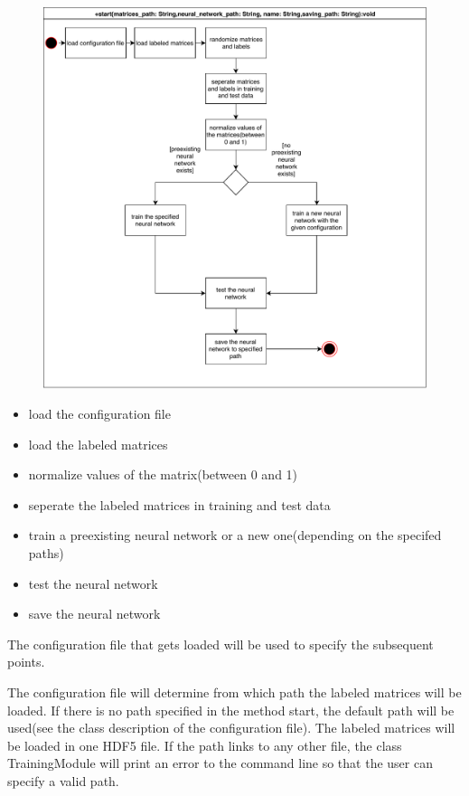 \documentclass[parskip=full]{scrartcl}
\begin{document}
\begin{figure}[h]
\begin{center}
\includegraphics[scale=0.9]{ActivityDiagrams/PDF/TrainingModule}
\label{Activity Diagrams}
\end{center}
\end{figure}

\begin{itemize}
\item load the configuration file
\item load the labeled matrices
\item normalize values of the matrix(between 0 and 1)
\item seperate the labeled matrices in training and test data
\item train a preexisting \gls{neural network} or a new one(depending on the specifed paths)
\item test the \gls{neural network}
\item save the \gls{neural network}
\end{itemize}

The configuration file that gets loaded will be used to specify the subsequent points.\newline

The configuration file will determine from which path the labeled matrices will be loaded.
If there is no path specified in the method start, the default path will be used(see the class description of the configuration file).
The labeled matrices will be loaded in one \gls{HDF5} file.
If the path links to any other file, the class TrainingModule will print an error to the command line so that the user can specify a valid path. \newline
\end{document}
